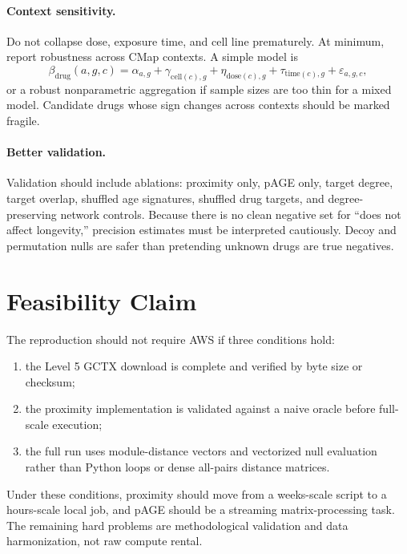 \documentclass[11pt]{article}
\begin{document}
\paragraph{Context sensitivity.}
Do not collapse dose, exposure time, and cell line prematurely. At minimum,
report robustness across CMap contexts. A simple model is
\[
  \beta_{\mathrm{drug}}(a,g,c)
  = \alpha_{a,g}+\gamma_{\mathrm{cell}(c),g}
    + \eta_{\mathrm{dose}(c),g}+\tau_{\mathrm{time}(c),g}
    + \varepsilon_{a,g,c},
\]
or a robust nonparametric aggregation if sample sizes are too thin for a mixed
model. Candidate drugs whose sign changes across contexts should be marked
fragile.

\paragraph{Better validation.}
Validation should include ablations: proximity only, pAGE only, target degree,
target overlap, shuffled age signatures, shuffled drug targets, and
degree-preserving network controls. Because there is no clean negative set for
``does not affect longevity,'' precision estimates must be interpreted
cautiously. Decoy and permutation nulls are safer than pretending unknown drugs
are true negatives.

\section{Feasibility Claim}

The reproduction should not require AWS if three conditions hold:
\begin{enumerate}[leftmargin=*]
  \item the Level 5 GCTX download is complete and verified by byte size or
  checksum;
  \item the proximity implementation is validated against a naive oracle before
  full-scale execution;
  \item the full run uses module-distance vectors and vectorized null
  evaluation rather than Python loops or dense all-pairs distance matrices.
\end{enumerate}
Under these conditions, proximity should move from a weeks-scale script to a
hours-scale local job, and pAGE should be a streaming matrix-processing task.
The remaining hard problems are methodological validation and data
harmonization, not raw compute rental.



\end{document}
